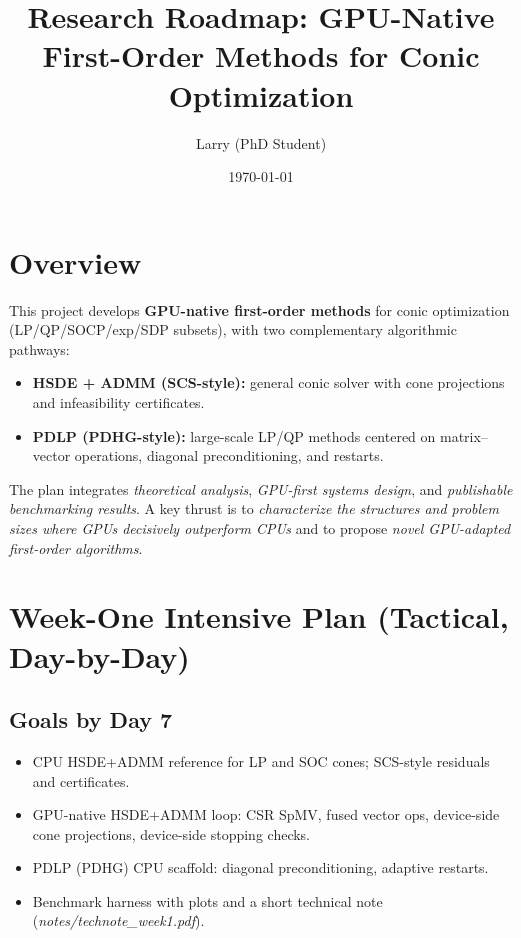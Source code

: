 \documentclass[12pt]{article}
\title{Research Roadmap: GPU-Native First-Order Methods for Conic Optimization}
\author{Larry (PhD Student)}
\date{\today}
\begin{document}
\maketitle

\section*{Overview}
This project develops \textbf{GPU-native first-order methods} for conic optimization (LP/QP/SOCP/exp/SDP subsets), with two complementary algorithmic pathways:
\begin{itemize}
  \item \textbf{HSDE + ADMM (SCS-style):} general conic solver with cone projections and infeasibility certificates.
  \item \textbf{PDLP (PDHG-style):} large-scale LP/QP methods centered on matrix--vector operations, diagonal preconditioning, and restarts.
\end{itemize}
The plan integrates \emph{theoretical analysis}, \emph{GPU-first systems design}, and \emph{publishable benchmarking results}. A key thrust is to \emph{characterize the structures and problem sizes where GPUs decisively outperform CPUs} and to propose \emph{novel GPU-adapted first-order algorithms}.

\section*{Week-One Intensive Plan (Tactical, Day-by-Day)}
\subsection*{Goals by Day 7}
\begin{itemize}
  \item CPU HSDE+ADMM reference for LP and SOC cones; SCS-style residuals and certificates.
  \item GPU-native HSDE+ADMM loop: CSR SpMV, fused vector ops, device-side cone projections, device-side stopping checks.
  \item PDLP (PDHG) CPU scaffold: diagonal preconditioning, adaptive restarts.
  \item Benchmark harness with plots and a short technical note (\emph{notes/technote\_week1.pdf}).
\end{itemize}
\end{document}

